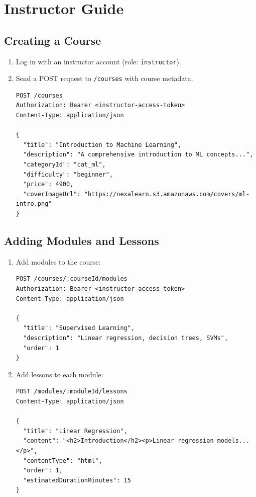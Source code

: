 \section{Instructor Guide}
\label{sec:app-instructor-guide}

\subsection{Creating a Course}

\begin{enumerate}
  \item Log in with an instructor account (role: \texttt{instructor}).
  \item Send a POST request to \texttt{/courses} with course metadata.

\begin{lstlisting}[caption=Create a course,label=lst:guide-create-course]
POST /courses
Authorization: Bearer <instructor-access-token>
Content-Type: application/json

{
  "title": "Introduction to Machine Learning",
  "description": "A comprehensive introduction to ML concepts...",
  "categoryId": "cat_ml",
  "difficulty": "beginner",
  "price": 4900,
  "coverImageUrl": "https://nexalearn.s3.amazonaws.com/covers/ml-intro.png"
}
\end{lstlisting}
\end{enumerate}

\subsection{Adding Modules and Lessons}

\begin{enumerate}
  \item Add modules to the course:

\begin{lstlisting}[caption=Add a module,label=lst:guide-add-module]
POST /courses/:courseId/modules
Authorization: Bearer <instructor-access-token>
Content-Type: application/json

{
  "title": "Supervised Learning",
  "description": "Linear regression, decision trees, SVMs",
  "order": 1
}
\end{lstlisting}

  \item Add lessons to each module:

\begin{lstlisting}[caption=Add a lesson,label=lst:guide-add-lesson]
POST /modules/:moduleId/lessons
Content-Type: application/json

{
  "title": "Linear Regression",
  "content": "<h2>Introduction</h2><p>Linear regression models...</p>",
  "contentType": "html",
  "order": 1,
  "estimatedDurationMinutes": 15
}
\end{lstlisting}
\end{enumerate}

